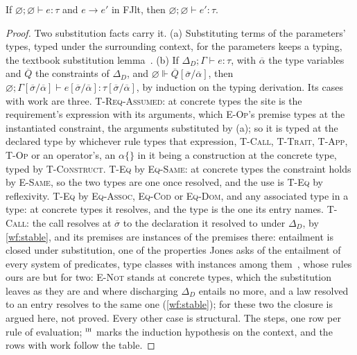 \begin{lemma}
\label{lem:subject}
If $\varnothing; \varnothing \vdash e : \tau$ and $e \longrightarrow e'$ in FJlt, then $\varnothing; \varnothing \vdash e' : \tau$.
\end{lemma}

\begin{proof}
Two substitution facts carry it.
(a) Substituting terms of the parameters' types, typed under the surrounding context, for the parameters keeps a typing, the textbook substitution lemma~\cite{pierce2002tapl}.
(b) If $\Delta_D; \Gamma \vdash e : \tau$, with $\overline{\alpha}$ the type variables and $\overline{Q}$ the constraints of $\Delta_D$, and $\varnothing \Vdash \overline{Q}[\overline{\sigma}/\overline{\alpha}]$, then $\varnothing; \Gamma[\overline{\sigma}/\overline{\alpha}] \vdash e[\overline{\sigma}/\overline{\alpha}] : \tau[\overline{\sigma}/\overline{\alpha}]$, by induction on the typing derivation.
Its cases with work are three.
\textsc{T-Req-Assumed}: at concrete types the site is the requirement's expression with its arguments, which \textsc{E-Op}'s premise types at the instantiated constraint, the arguments substituted by (a); so it is typed at the declared type by whichever rule types that expression, \textsc{T-Call}, \textsc{T-Trait}, \textsc{T-App}, \textsc{T-Op} or an operator's, an $\alpha\texttt{\{\}}$ in it being a construction at the concrete type, typed by \textsc{T-Construct}.
\textsc{T-Eq} by \textsc{Eq-Same}: at concrete types the constraint holds by \textsc{E-Same}, so the two types are one once resolved, and the use is \textsc{T-Eq} by reflexivity.
\textsc{T-Eq} by \textsc{Eq-Assoc}, \textsc{Eq-Cod} or \textsc{Eq-Dom}, and any associated type in a type: at concrete types it resolves, and the type is the one its entry names.
\textsc{T-Call}: the call resolves at $\overline{\sigma}$ to the declaration it resolved to under $\Delta_D$, by \ref{wf:stable}, and its premises are instances of the premises there: entailment is closed under substitution, one of the properties Jones asks of the entailment of every system of predicates, type classes with instances among them~\cite{jones1992theory,jones1994qualified}, whose rules ours are but for two: \textsc{E-Not} stands at concrete types, which the substitution leaves as they are and where discharging $\Delta_D$ entails no more, and a law resolved to an entry resolves to the same one (\ref{wf:stable}); for these two the closure is argued here, not proved.
Every other case is structural.
The steps, one row per rule of evaluation; ${}^{\textsc{ih}}$ marks the induction hypothesis on the context, and the rows with work follow the table.

\end{proof}
